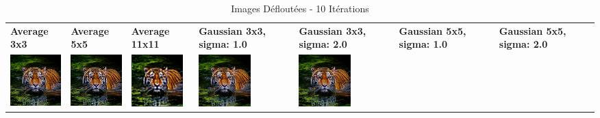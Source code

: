 \begin{table}[h!]
    \centering
    \captionsetup{justification=centering}
    \caption*{Images Défloutées - 10 Itérations}
    \begin{tabular}{>{\centering\arraybackslash} m{2cm} >{\centering\arraybackslash} m{2cm} >{\centering\arraybackslash} m{2cm} >{\centering\arraybackslash} m{2cm} >{\centering\arraybackslash} m{2cm} >{\centering\arraybackslash} m{2cm} >{\centering\arraybackslash} m{2cm}}
        \textbf{Average 3x3}                                                                            & \textbf{Average 5x5} & \textbf{Average 11x11} & \textbf{Gaussian 3x3, sigma: 1.0} & \textbf{Gaussian 3x3, sigma: 2.0} & \textbf{Gaussian 5x5, sigma: 1.0} & \textbf{Gaussian 5x5, sigma: 2.0} \\
        \includegraphics[width=2cm]{images/processed/tiger/average_3x3/unblurred_10-iter.png}           &
        \includegraphics[width=2cm]{images/processed/tiger/average_5x5/unblurred_10-iter.png}           &
        \includegraphics[width=2cm]{images/processed/tiger/average_11x11/unblurred_10-iter.png}         &
        \includegraphics[width=2cm]{images/processed/tiger/gaussian_3x3_sigma1.0/unblurred_10-iter.png} &
        \includegraphics[width=2cm]{images/processed/tiger/gaussian_3x3_sigma2.0/unblurred_10-iter.png} &

\end{tabular}
\end{table}

